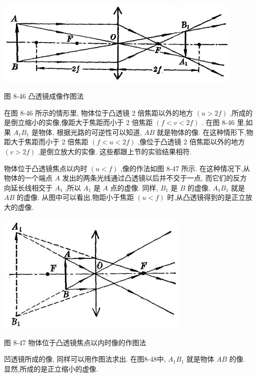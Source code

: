 \documentclass[10pt]{article}
\begin{document}
\begin{center}
\includegraphics[max width=0.9\textwidth]{images/01913056-1f15-74d8-9184-9aab52c9d66b_279_373692.jpg}
\end{center}

图 8-46 凸透镜成像作图法

在图 8-46 所示的情形里, 物体位于凸透镜 2 倍焦距以外的地方 \(\left( {u > {2f}}\right)\) ,所成的是倒立缩小的实像,像距大于焦距而小于 2 倍焦距 \(\left( {f < v < {2f}}\right)\) . 在图 8-46 里,如果 \({A}_{1}{B}_{1}\) 是物体, 根据光路的可逆性可以知道, \({AB}\) 就是物体的像. 在这种情形下,物距大于焦距而小于 2 倍焦距 \(\left( {f < u < {2f}}\right)\) ,像位于凸透镜 2 倍焦距以外的地方 \(\left( {v > {2f}}\right)\) ,是倒立放大的实像. 这些都跟上节的实验结果相符.

物体位于凸透镜焦点以内时 \(\left( {u < f}\right)\) ,像的作法如图 8-47 所示. 在这种情况下,从物体的一个端点 \(A\) 发出的两条光线通过凸透镜以后并不交于一点, 而它们的反方向延长线相交于 \({A}_{1}\) ,所以 \({A}_{1}\) 是 \(A\) 点的虚像. 同样, \({B}_{1}\) 是 \(B\) 的虚像, \({A}_{1}{B}_{1}\) 就是 \({AB}\) 的虚像. 从图中可以看出,物距小于焦距 \(\left( {u < f}\right)\) 时,从凸透镜得到的是正立放大的虚像.

\begin{center}
\includegraphics[max width=0.7\textwidth]{images/01913056-1f15-74d8-9184-9aab52c9d66b_280_716170.jpg}
\end{center}

图 8-47 物体位于凸透镜焦点以内时像的作图法

凹透镜所成的像, 同样可以用作图法求出. 在图8-48中, \({A}_{1}{B}_{1}\) 就是物体 \({AB}\) 的像. 显然,所成的是正立缩小的虚像.
\end{document}
